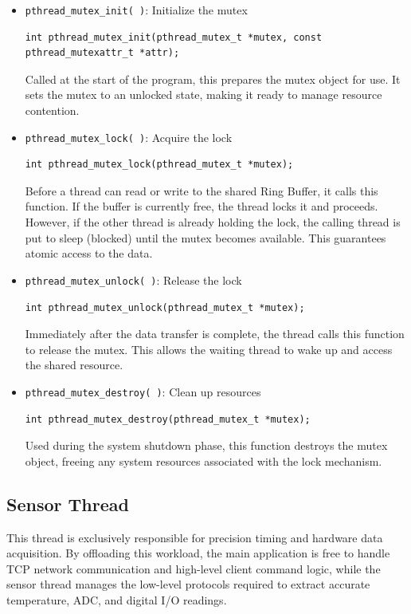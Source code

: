 \begin{itemize}
    \item \texttt{pthread\_mutex\_init( )}: Initialize the mutex
    \begin{verbatim}
int pthread_mutex_init(pthread_mutex_t *mutex, const pthread_mutexattr_t *attr);
    \end{verbatim}
    Called at the start of the program, this prepares the mutex object for
    use. It sets the mutex to an unlocked state, making it ready to manage
    resource contention.

    \item \texttt{pthread\_mutex\_lock( )}: Acquire the lock
    \begin{verbatim}
int pthread_mutex_lock(pthread_mutex_t *mutex);
    \end{verbatim}
    Before a thread can read or write to the shared Ring Buffer, it calls this
    function. If the buffer is currently free, the thread locks it and
    proceeds. However, if the other thread is already holding the lock, the
    calling thread is put to sleep (blocked) until the mutex becomes
    available. This guarantees atomic access to the data.

    \item \texttt{pthread\_mutex\_unlock( )}: Release the lock
    \begin{verbatim}
int pthread_mutex_unlock(pthread_mutex_t *mutex);
    \end{verbatim}
    Immediately after the data transfer is complete, the thread calls this
    function to release the mutex. This allows the waiting thread to wake up
    and access the shared resource.

    \item \texttt{pthread\_mutex\_destroy( )}: Clean up resources
    \begin{verbatim}
int pthread_mutex_destroy(pthread_mutex_t *mutex);
    \end{verbatim}
    Used during the system shutdown phase, this function destroys the mutex
    object, freeing any system resources associated with the lock mechanism.
\end{itemize}


\subsection{Sensor Thread}
This thread is exclusively responsible for precision timing and hardware data
acquisition. By offloading this workload, the main application is free to
handle TCP network communication and high-level client command logic, while
the sensor thread manages the low-level protocols required to extract accurate
temperature, ADC, and digital I/O readings.

